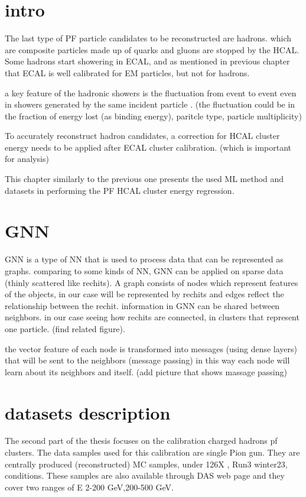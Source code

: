 \section{intro}

The last type of PF particle candidates to be reconstructed are hadrons. which are composite particles made up of quarks and gluons are stopped by the HCAL.
Some hadrons start showering in ECAL, and as mentioned in previous chapter that ECAL is well calibrated for EM particles, but not for hadrons.

a key feature of the hadronic showers is the fluctuation from event to event even in showers generated by the same incident particle . (the fluctuation could be in the fraction of energy lost (as binding energy), paritcle type, particle multiplicity) 

To accurately reconstruct hadron candidates, a correction for HCAL cluster energy needs to be applied after ECAL cluster calibration. (which is important for analysis) 

This chapter similarly to the previous one presents the used ML method and datasets in performing the PF HCAL cluster energy regression.

\section{GNN} %

GNN is a type of NN that is used to process data that can be represented as graphs. comparing to some kinds of NN, GNN can be applied on sparse data (thinly scattered like rechits). A graph consists of nodes which represent features of the objects, in our case will be represented by rechits and edges reflect the relationship between the rechit. information in GNN can be shared between neighbors. in our case seeing how rechits are connected, in clusters that represent one particle. (find related figure).

the vector feature of each node is transformed into messages (using dense layers) that will be sent to the neighbors (message passing) in this way each node will learn about its neighbors and itself. (add picture that shows massage passing) 



\section{datasets description}

The second part of the thesis focuses on the calibration charged hadrons pf clusters.
The data samples used for this calibration are single Pion gun.
They are centrally produced (reconstructed) MC samples, under 126X %
, Run3 winter23, conditions. These samples are also available through DAS web page and they cover two ranges of E 2-200 GeV,200-500 GeV.  

